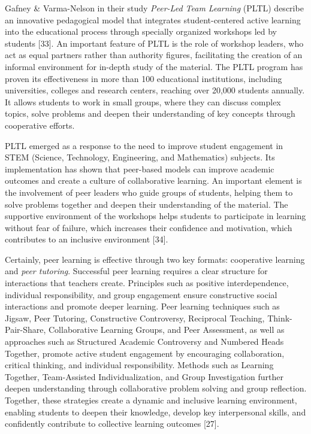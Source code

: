 \begin{multicols}{2}
Gafney \& Varma-Nelson in their study \emph{Peer-Led Team Learning}
(PLTL) describe an innovative pedagogical model that integrates
student-centered active learning into the educational process through
specially organized workshops led by students {[}33{]}. An important
feature of PLTL is the role of workshop leaders, who act as equal
partners rather than authority figures, facilitating the creation of an
informal environment for in-depth study of the material. The PLTL
program has proven its effectiveness in more than 100 educational
institutions, including universities, colleges and research centers,
reaching over 20,000 students annually. It allows students to work in
small groups, where they can discuss complex topics, solve problems and
deepen their understanding of key concepts through cooperative efforts.

PLTL emerged as a response to the need to improve student engagement in
STEM (Science, Technology, Engineering, and Mathematics) subjects. Its
implementation has shown that peer-based models can improve academic
outcomes and create a culture of collaborative learning. An important
element is the involvement of peer leaders who guide groups of students,
helping them to solve problems together and deepen their understanding
of the material. The supportive environment of the workshops helps
students to participate in learning without fear of failure, which
increases their confidence and motivation, which contributes to an
inclusive environment {[}34{]}.

Certainly, peer learning is effective through two key formats:
cooperative learning and \emph{peer tutoring}. Successful peer learning
requires a clear structure for interactions that teachers create.
Principles such as positive interdependence, individual responsibility,
and group engagement ensure constructive social interactions and promote
deeper learning. Peer learning techniques such as Jigsaw, Peer Tutoring,
Constructive Controversy, Reciprocal Teaching, Think-Pair-Share,
Collaborative Learning Groups, and Peer Assessment, as well as
approaches such as Structured Academic Controversy and Numbered Heads
Together, promote active student engagement by encouraging
collaboration, critical thinking, and individual responsibility. Methods
such as Learning Together, Team-Assisted Individualization, and Group
Investigation further deepen understanding through collaborative problem
solving and group reflection. Together, these strategies create a
dynamic and inclusive learning environment, enabling students to deepen
their knowledge, develop key interpersonal skills, and confidently
contribute to collective learning outcomes {[}27{]}.


\end{multicols}
